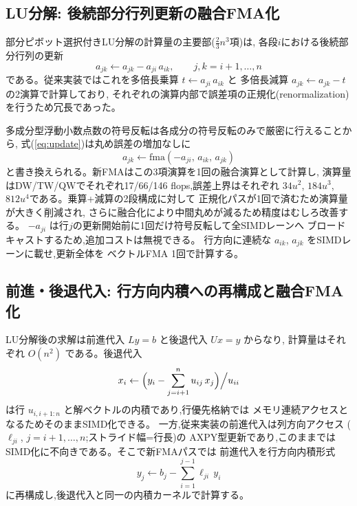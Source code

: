 \documentclass[a4j,dvipdfmx,11pt]{jsarticle}
\begin{document}
\subsection{LU分解: 後続部分行列更新の融合FMA化}

部分ピボット選択付きLU分解の計算量の主要部($\frac{2}{3}n^3$項)は,
各段$i$における後続部分行列の更新
\begin{equation}
a_{jk} \leftarrow a_{jk} - a_{ji}\, a_{ik},
\qquad j, k = i+1, \ldots, n
\label{eq:update}
\end{equation}
である。従来実装ではこれを多倍長乗算 $t \leftarrow a_{ji}\,a_{ik}$ と
多倍長減算 $a_{jk} \leftarrow a_{jk} - t$ の2演算で計算しており,
それぞれの演算内部で誤差項の正規化(renormalization)を行うため冗長であった。

多成分型浮動小数点数の符号反転は各成分の符号反転のみで厳密に行えることから,
式(\ref{eq:update})は丸め誤差の増加なしに
\begin{equation}
a_{jk} \leftarrow \mathrm{fma}(-a_{ji},\, a_{ik},\, a_{jk})
\label{eq:fma}
\end{equation}
と書き換えられる。新FMAはこの3項演算を1回の融合演算として計算し,
演算量はDW/TW/QWでそれぞれ17/66/146 flops,誤差上界はそれぞれ
$34u^2$, $184u^3$, $812u^4$である。乗算+減算の2段構成に対して
正規化パスが1回で済むため演算量が大きく削減され,
さらに融合化により中間丸めが減るため精度はむしろ改善する。
$-a_{ji}$ は行$j$の更新開始前に1回だけ符号反転して全SIMDレーンへ
ブロードキャストするため,追加コストは無視できる。
行方向に連続な $a_{ik}$, $a_{jk}$ をSIMDレーンに載せ,更新全体を
ベクトルFMA 1回で計算する。

\subsection{前進・後退代入: 行方向内積への再構成と融合FMA化}
\label{sec:solve-method}

LU分解後の求解は前進代入 $Ly = b$ と後退代入 $Ux = y$ からなり,
計算量はそれぞれ $O(n^2)$ である。後退代入
\begin{equation}
x_i \leftarrow \Bigl( y_i - \sum_{j=i+1}^{n} u_{ij}\, x_j \Bigr) \Big/ u_{ii}
\end{equation}
は行 $u_{i,i+1:n}$ と解ベクトルの内積であり,行優先格納では
メモリ連続アクセスとなるためそのままSIMD化できる。
一方,従来実装の前進代入は列方向アクセス
($\ell_{ji}$, $j = i+1, \ldots, n$;ストライド幅=行長)の
AXPY型更新であり,このままではSIMD化に不向きである。そこで新FMAパスでは
前進代入を行方向内積形式
\begin{equation}
y_j \leftarrow b_j - \sum_{i=1}^{j-1} \ell_{ji}\, y_i
\end{equation}
に再構成し,後退代入と同一の内積カーネルで計算する。
\end{document}
